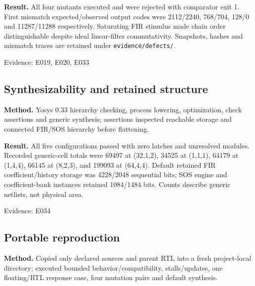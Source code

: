 \documentclass[11pt,a4paper]{article}
\begin{document}
\textbf{Result.} All four mutants executed and were rejected with comparator exit 1. First mismatch expected/\allowbreak{}observed output codes were 2112/\allowbreak{}2240,\allowbreak{} 768/\allowbreak{}704,\allowbreak{} 128/\allowbreak{}0 and 11287/\allowbreak{}11288 respectively. Saturating FIR stimulus made chain order distinguishable despite ideal linear-filter commutativity. Snapshots,\allowbreak{} hashes and mismatch traces are retained under \texttt{evidence/\allowbreak{}defects/\allowbreak{}}.

{\small Evidence: E019,\allowbreak{} E020,\allowbreak{} E033}

\subsection{Synthesizability and retained structure}

\textbf{Method.} Yosys 0.33 hierarchy checking,\allowbreak{} process lowering,\allowbreak{} optimization,\allowbreak{} check assertions and generic synthesis; assertions inspected reachable storage and connected FIR/\allowbreak{}SOS hierarchy before flattening.

\textbf{Result.} All five configurations passed with zero latches and unresolved modules. Recorded generic-cell totals were 69497 at (\allowbreak{}32,\allowbreak{}1,\allowbreak{}2)\allowbreak{},\allowbreak{} 34525 at (\allowbreak{}1,\allowbreak{}1,\allowbreak{}1)\allowbreak{},\allowbreak{} 64179 at (\allowbreak{}1,\allowbreak{}4,\allowbreak{}4)\allowbreak{},\allowbreak{} 66145 at (\allowbreak{}8,\allowbreak{}2,\allowbreak{}3)\allowbreak{},\allowbreak{} and 199093 at (\allowbreak{}64,\allowbreak{}4,\allowbreak{}4)\allowbreak{}. Default retained FIR coefficient/\allowbreak{}history storage was 4228/\allowbreak{}2048 sequential bits; SOS engine and coefficient-bank instances retained 1084/\allowbreak{}1484 bits. Counts describe generic netlists,\allowbreak{} not physical area.

{\small Evidence: E034}

\subsection{Portable reproduction}

\textbf{Method.} Copied only declared sources and parent RTL into a fresh project-local directory; executed bounded behavior/\allowbreak{}compatibility,\allowbreak{} stalls/\allowbreak{}updates,\allowbreak{} one floating/\allowbreak{}RTL response case,\allowbreak{} four mutation pairs and default synthesis.
\end{document}
